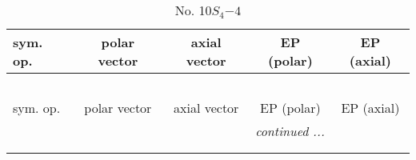 \documentclass[fleqn,10pt,landscape]{jsarticle}
\begin{document}
\begin{center}
\renewcommand{\arraystretch}{1.3}
\begin{longtable}{lcccc}
\caption{No. 10\quad$S_{4}$\quad$-4$\quad[ tetragonal ]}
 \\
 \hline \hline
sym. op. & polar vector & axial vector & EP (polar) & EP (axial) \\ \hline \endfirsthead

\multicolumn{4}{l}{\tablename\ \thetable{}} \\
 \hline \hline
sym. op. & polar vector & axial vector & EP (polar) & EP (axial) \\ \hline \endhead

 \hline \hline
\multicolumn{4}{r}{\footnotesize\it continued ...} \\ \endfoot

 \hline \hline
\multicolumn{4}{r}{} \\ \endlastfoot


\end{longtable}
\end{center}
\end{document}
